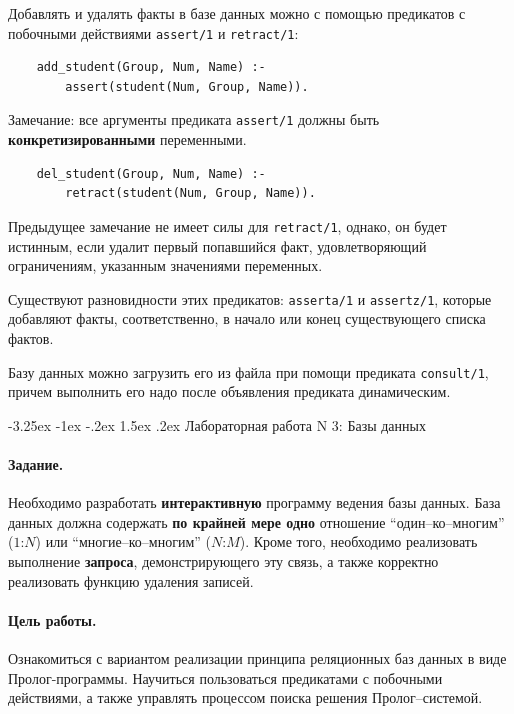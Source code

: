 \documentclass[12pt, openany, twoside]{book} %
\makeatletter
\renewcommand\section{\@startsection {section}{1}{\z@}%
                                   {-3.25ex \@plus -1ex \@minus -.2ex}%
                                   {1.5ex \@plus.2ex}%
                                   {\normalfont\large\bfseries}}
\makeatother
\begin{document}
Добавлять и удалять факты в базе данных можно с помощью предикатов с побочными действиями {\tt assert/1} и {\tt retract/1}:

{\tt\begin{verbatim}
    add_student(Group, Num, Name) :-
        assert(student(Num, Group, Name)).
\end{verbatim}}

\noindent Замечание: все аргументы предиката {\tt assert/1} должны быть {\bf конкретизированными} переменными.

{\tt\begin{verbatim}
    del_student(Group, Num, Name) :-
        retract(student(Num, Group, Name)).
\end{verbatim}}
\noindent Предыдущее замечание не имеет силы для {\tt retract/1}, однако, он будет истинным, если удалит первый попавшийся факт, удовлетворяющий ограничениям, указанным значениями переменных.

Существуют разновидности этих предикатов: {\tt asserta/1} и {\tt assertz/1}, которые добавляют факты, соответственно, в начало или конец существующего списка фактов.

Базу данных можно загрузить его из файла при помощи предиката {\tt consult/1}, причем выполнить его надо после объявления предиката динамическим.

\section{Лабораторная работа N 3: Базы данных}
\paragraph{Задание.} Необходимо разработать {\bf интерактивную} программу ведения базы данных. База данных должна содержать {\bf по крайней мере одно} отношение ``один--ко--многим'' ($1$:$N$) или ``многие--ко--многим'' ($N$:$M$). Кроме того, необходимо реализовать выполнение {\bf запроса}, демонстрирующего эту связь, а также корректно реализовать функцию удаления записей.

\paragraph{Цель работы.} Ознакомиться с вариантом реализации принципа реляционных баз данных в виде Пролог-программы. Научиться пользоваться предикатами с побочными действиями, а также управлять процессом поиска решения Пролог--системой.
\end{document}
